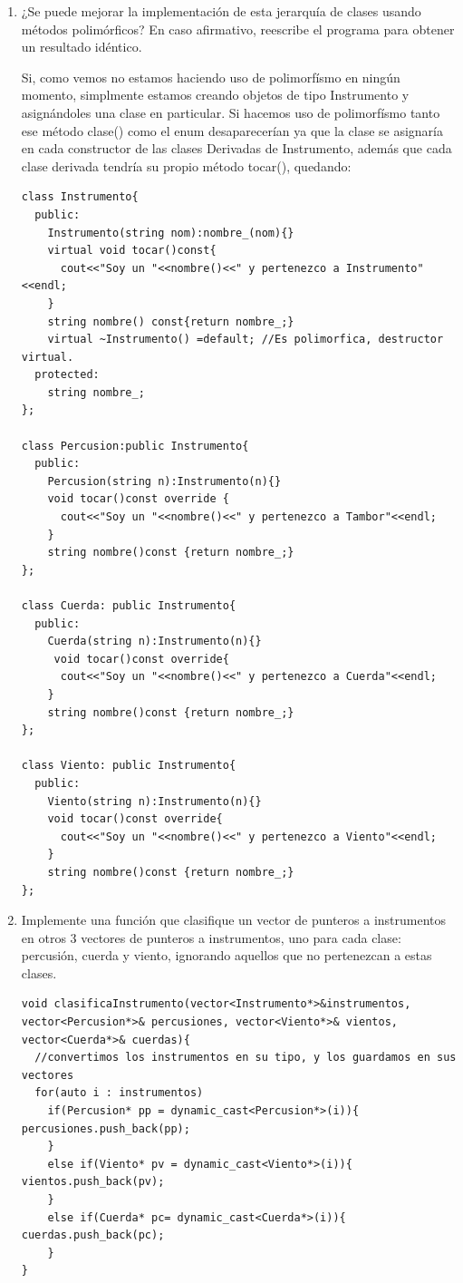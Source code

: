 \begin{enumerate}[label = \alph*)]
  \item ¿Se puede mejorar la implementación de esta jerarquía de clases usando métodos polimórficos? En caso afirmativo, reescribe el programa para obtener un resultado idéntico.
  
  Si, como vemos no estamos haciendo uso de polimorfísmo en ningún momento, simplmente estamos creando objetos de tipo Instrumento y asignándoles una clase en particular.
  Si hacemos uso de polimorfísmo tanto ese método clase() como el enum desaparecerían ya que la clase se asignaría en cada constructor de las clases Derivadas de Instrumento, además que cada clase derivada tendría su propio método tocar(), quedando:
\begin{verbatim}
class Instrumento{
  public:
    Instrumento(string nom):nombre_(nom){}
    virtual void tocar()const{
      cout<<"Soy un "<<nombre()<<" y pertenezco a Instrumento"<<endl;
    }
    string nombre() const{return nombre_;}
    virtual ~Instrumento() =default; //Es polimorfica, destructor virtual.
  protected:
    string nombre_;
};

class Percusion:public Instrumento{
  public:
    Percusion(string n):Instrumento(n){}
    void tocar()const override {
      cout<<"Soy un "<<nombre()<<" y pertenezco a Tambor"<<endl;
    }
    string nombre()const {return nombre_;}
};  

class Cuerda: public Instrumento{
  public:
    Cuerda(string n):Instrumento(n){}
     void tocar()const override{
      cout<<"Soy un "<<nombre()<<" y pertenezco a Cuerda"<<endl;
    }
    string nombre()const {return nombre_;}
};

class Viento: public Instrumento{
  public:
    Viento(string n):Instrumento(n){}
    void tocar()const override{
      cout<<"Soy un "<<nombre()<<" y pertenezco a Viento"<<endl;
    }
    string nombre()const {return nombre_;}
};
\end{verbatim}
  \item Implemente una función que clasifique un vector de punteros a instrumentos en otros 3 vectores de punteros a instrumentos, uno para cada clase: percusión, cuerda y viento, ignorando aquellos que no pertenezcan a estas clases.
\begin{verbatim}
void clasificaInstrumento(vector<Instrumento*>&instrumentos, vector<Percusion*>& percusiones, vector<Viento*>& vientos, vector<Cuerda*>& cuerdas){
  //convertimos los instrumentos en su tipo, y los guardamos en sus vectores
  for(auto i : instrumentos)
    if(Percusion* pp = dynamic_cast<Percusion*>(i)){ percusiones.push_back(pp);
    }
    else if(Viento* pv = dynamic_cast<Viento*>(i)){ vientos.push_back(pv);
    }
    else if(Cuerda* pc= dynamic_cast<Cuerda*>(i)){ cuerdas.push_back(pc);
    }
}
\end{verbatim}
\end{enumerate}
